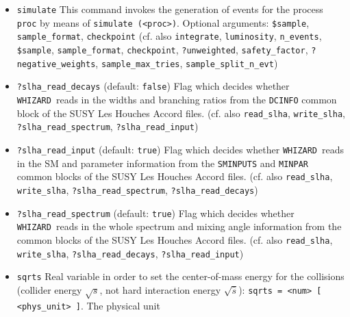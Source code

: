 \documentclass[12pt]{book}
\newcommand{\ttt}[1]{\texttt{#1}}
\newcommand{\whizard}{\texttt{WHIZARD}}
\begin{document}
\begin{itemize}
log file \ttt{whizard.log}. Examples are \ttt{show(<parameter\_name>)}
to issue a specific parameter from a model or a constant defined in a
SINDARIN input file, \ttt{show(integral(<proc\_name>))},
\ttt{show(library)}, \ttt{show(results)}, or \ttt{show(<var>)} for any
arbitrary variable. Further possibilities are \ttt{show(real)},
\ttt{show(string)}, \ttt{show(logical)} etc. to allow to show all
defined real, string, logical etc. variables, respectively. 
(cf. also \ttt{library}, \ttt{results})
\item
\ttt{simulate} \newline
This command invokes the generation of events for the process
\ttt{proc} by means of \ttt{simulate (<proc>)}.
Optional arguments: \ttt{\$sample}, \ttt{sample\_format},
\ttt{checkpoint} (cf. also \ttt{integrate}, \ttt{luminosity},
\ttt{n\_events}, \ttt{\$sample}, \ttt{sample\_format},
\ttt{checkpoint}, \ttt{?unweighted}, \ttt{safety\_factor},
\ttt{?negative\_weights}, \ttt{sample\_max\_tries}, \ttt{sample\_split\_n\_evt})
\item
\ttt{?slha\_read\_decays} \qquad (default: \ttt{false}) \newline
Flag which decides whether \whizard\ reads in the widths and branching
ratios from the \ttt{DCINFO} common block of the SUSY Les Houches
Accord files. (cf. also \ttt{read\_slha}, \ttt{write\_slha},
\ttt{?slha\_read\_spectrum}, 
\ttt{?slha\_read\_input}) 
\item
\ttt{?slha\_read\_input} \qquad (default: \ttt{true}) \newline
Flag which decides whether \whizard\ reads in the SM
and parameter information from the \ttt{SMINPUTS} and \ttt{MINPAR}
common blocks of the SUSY Les Houches Accord files. (cf. also
\ttt{read\_slha}, \ttt{write\_slha}, \ttt{?slha\_read\_spectrum},
\ttt{?slha\_read\_decays})
\item
\ttt{?slha\_read\_spectrum} \qquad (default: \ttt{true}) \newline
Flag which decides whether \whizard\ reads in the whole spectrum and
mixing angle information from the common blocks of the SUSY Les
Houches Accord files. (cf. also \ttt{read\_slha}, \ttt{write\_slha},
\ttt{?slha\_read\_decays}, \ttt{?slha\_read\_input})  
\item
\ttt{sqrts} \newline
Real variable in order to set the center-of-mass energy for the
collisions (collider energy $\sqrt{s}$, not hard interaction energy 
$\sqrt{\hat{s}}$): \ttt{sqrts = <num> [ <phys\_unit> ]}. The physical unit

\end{itemize}
\end{document}

